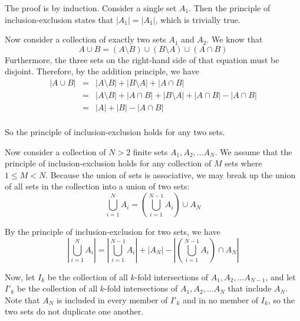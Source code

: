 \documentclass[12pt]{article}
\begin{document}
The proof is by induction.  Consider a single set $A_1$.  Then the principle of inclusion-exclusion states that $|A_1| = |A_1|$, which is trivially true.

Now consider a collection of exactly two sets $A_1$ and $A_2$.  We know that
$$A \cup B = (A \setminus B) \cup (B \setminus A) \cup (A \cap B)$$
Furthermore, the three sets on the right-hand side of that equation must be disjoint.  Therefore, by the addition principle, we have
\begin{eqnarray*}
|A \cup B| &=& |A \setminus B| + |B \setminus A| + |A \cap B| \\
&=& |A \setminus B | + |A \cap B| + |B \setminus A| + |A \cap B| - |A \cap B| \\
&=& |A| + |B| - |A \cap B| \\
\end{eqnarray*}

So the principle of inclusion-exclusion holds for any two sets.

Now consider a collection of $N > 2$ finite sets $A_1, A_2, \dots A_N$.  We assume that the principle of inclusion-exclusion holds for any collection of $M$ sets where $1 \leq M < N$.  Because the union of sets is associative, we may break up the union of all sets in the collection into a union of two sets:
$$\bigcup_{i=1}^N A_i = \left( \bigcup_{i=1}^{N-1} A_i \right ) \cup A_N$$

By the principle of inclusion-exclusion for two sets, we have
$$\left | \bigcup_{i=1}^N A_i \right | = \left | \bigcup_{i=1}^{N-1} A_i \right| + |A_N| - \left|\left( \bigcup_{i=1}^{N-1} A_i \right ) \cap A_N \right|$$

Now, let $I_k$ be the collection of all $k$-fold intersections of $A_1, A_2, \dots A_{N-1}$, and let $I'_k$ be the collection of all $k$-fold intersections of $A_1, A_2, \dots A_N$ that include $A_N$.  Note that $A_N$ is included in every member of $I'_k$ and in no member of $I_k$, so the two sets do not duplicate one another.
\end{document}
